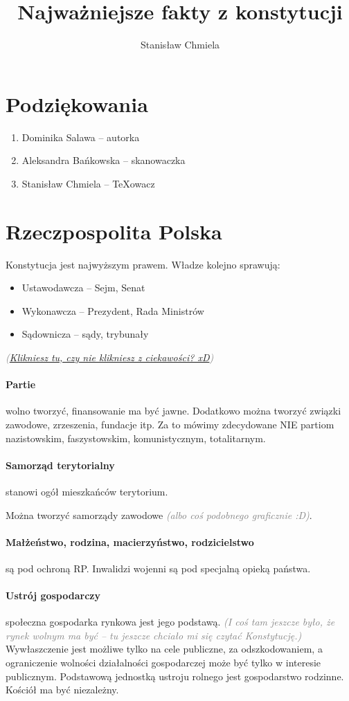 \documentclass [a4paper, 12pt, oneside]{article}
\author{Stanisław Chmiela}
\title{Najważniejsze fakty z konstytucji}
\newcommand{\comment}[1]{\textcolor{Gray}{\textsf{\emph{(#1)}}}}
\begin{document}
\section{Podziękowania}
\begin{enumerate}
    \item Dominika Salawa -- autorka
    \item Aleksandra Bańkowska -- skanowaczka
    \item Stanisław Chmiela -- \TeX owacz
\end{enumerate}
\clearpage
\section{Rzeczpospolita Polska} %
\label{sec:rzeczpospolita_polska}
    Konstytucja jest najwyższym prawem. Władze kolejno sprawują:
    \begin{itemize}
        \item Ustawodawcza -- Sejm, Senat
        \item Wykonawcza -- Prezydent, Rada Ministrów
        \item Sądownicza -- sądy, trybunały
    \end{itemize}
\comment{\href{http://www.youtube.com/watch?v=C-u5WLJ9Yk4}{Klikniesz tu, czy nie klikniesz z ciekawości? xD}}
    \paragraph{Partie} wolno tworzyć, finansowanie ma być jawne. Dodatkowo można tworzyć związki zawodowe, zrzeszenia, fundacje itp. Za to mówimy zdecydowane NIE partiom nazistowskim, faszystowskim, komunistycznym, totalitarnym.
    \paragraph{Samorząd terytorialny} stanowi ogół mieszkańców terytorium.

    Można tworzyć samorządy zawodowe \comment{albo coś podobnego graficznie :D}.

    \paragraph{Małżeństwo, rodzina, macierzyństwo, rodzicielstwo} są pod ochroną RP. Inwalidzi wojenni są pod specjalną opieką państwa.

    \paragraph{Ustrój gospodarczy} społeczna gospodarka rynkowa jest jego podstawą. \comment{I coś tam jeszcze było, że rynek wolnym ma być -- tu jeszcze chciało mi się czytać Konstytucję.} Wywłaszczenie jest możliwe tylko na cele publiczne, za odszkodowaniem, a ograniczenie wolności działalności gospodarczej może być tylko w interesie publicznym. Podstawową jednostką ustroju rolnego jest gospodarstwo rodzinne. Kościół ma być niezależny.
\end{document}

